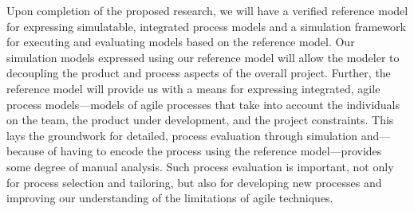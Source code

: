 


Upon completion of the proposed research, we will have a verified reference
model for expressing simulatable, integrated process models and a
simulation framework for executing and evaluating models based on the reference
model.  Our simulation models expressed using our reference model will allow the
modeler to decoupling the product and process aspects of the overall
project. 
Further, the reference model will provide us with a means for expressing
integrated, agile process models---models of agile processes that take into account the
individuals on the team, the product under development, and the project
constraints.  This lays the groundwork for detailed, \apriori process evaluation
through simulation and---because of having to encode the process using the
reference model---provides some degree of manual analysis.  Such process
evaluation is important, not only for \apriori process selection and tailoring,
but also for developing new processes and improving our understanding of the
limitations of agile techniques.
